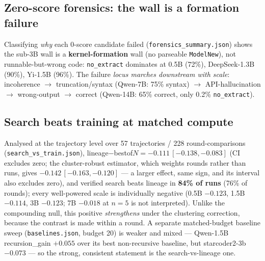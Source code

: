 \subsection{Zero-score forensics: the wall is a formation failure}
Classifying \emph{why} each 0-score candidate failed (\texttt{forensics\_summary.json}) shows the sub-3B wall is
a \textbf{kernel-formation} wall (no parseable \texttt{ModelNew}), not runnable-but-wrong code: \texttt{no\_extract}
dominates at 0.5B (72\%), DeepSeek-1.3B (90\%), Yi-1.5B (96\%). The failure \emph{locus marches downstream with
scale}: incoherence $\to$ truncation/syntax (Qwen-7B: 75\% syntax) $\to$ API-hallucination $\to$ wrong-output
$\to$ correct (Qwen-14B: 65\% correct, only 0.2\% \texttt{no\_extract}).


\subsection{Search beats training at matched compute}
Analysed at the trajectory level over 57 trajectories / 228 round-comparisons
(\texttt{search\_vs\_train.json}), lineage$-$bestof$N = -0.111\,[-0.138,-0.083]$ (CI excludes zero; the
cluster-robust estimator, which weights rounds rather than runs, gives $-0.142\,[-0.163,-0.120]$ --- a larger effect, same sign, and its interval also excludes zero), and verified search beats lineage in \textbf{84\% of runs}
(76\% of rounds); every well-powered scale is individually negative (0.5B $-0.123$, 1.5B $-0.114$,
3B $-0.123$; 7B $-0.018$ at $n{=}5$ is not interpreted). Unlike the compounding null, this positive
\emph{strengthens} under the clustering correction, because the contrast is made within a round. A separate matched-budget baseline sweep (\texttt{baselines.json},
budget 20) is weaker and mixed --- Qwen-1.5B recursion\_gain $+0.055$ over its best non-recursive baseline, but
starcoder2-3b $-0.073$ --- so the strong, consistent statement is the search-vs-lineage one.


